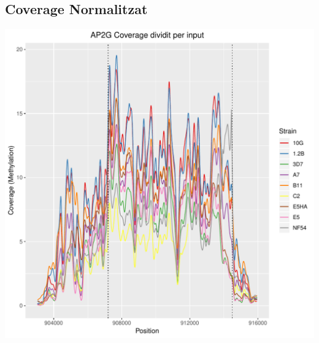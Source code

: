 \documentclass{article}\usepackage[]{graphicx}\usepackage[]{color}
\newenvironment{knitrout}{}{} %
\begin{document}
\subsection{Coverage Normalitzat}
\begin{knitrout}
\color{fgcolor}
\includegraphics[width=1\linewidth]{figure/plot_norm_cov-1} 

\end{knitrout}
\clearpage
\end{document}
